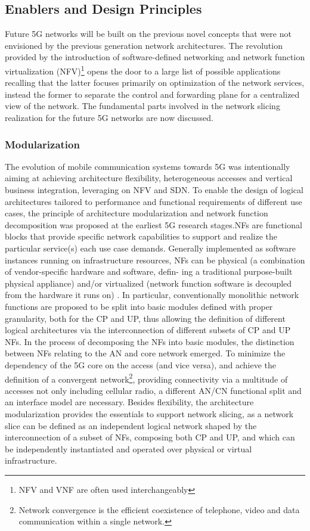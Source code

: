 \documentclass{article}
\begin{document}
\subsection{Enablers and Design Principles}
Future 5G networks will be built on the previous novel concepts that were not envisioned by the previous generation
network architectures. The revolution provided by the introduction of software-defined networking
and network function virtualization (NFV)\footnote{NFV and VNF are often used interchangeably} opens the door to a
large list of possible applications recalling that the latter focuses primarily on optimization of the network services, instead the former to separate the control and forwarding plane for a centralized view of the network. The fundamental parts involved in the network slicing realization for the future 5G networks are now discussed.

\subsubsection{Modularization}
The evolution of mobile communication systems towards 5G was intentionally aiming at achieving
architecture flexibility, heterogeneous accesses and vertical business integration, leveraging on NFV and SDN. To enable the design of logical architectures tailored to
performance and functional requirements of different use cases, the principle of architecture
modularization and network function decomposition was proposed at the earliest 5G research
stages.\gls{NF}s are functional blocks
that provide specific network capabilities to support and realize the particular service(s) each
use case demands. Generally implemented
as software instances running on infrastructure
resources, NFs can be physical (a combination
of vendor-specific hardware and software, defin-
ing a traditional purpose-built physical appliance)
and/or virtualized (network function software is
decoupled from the hardware it runs on) \cite{ordonez2017network}. In particular, conventionally monolithic network functions are proposed to be split into basic modules defined with proper granularity, both for the \gls{CP} and \gls{UP}, thus allowing the definition of different logical architectures via the interconnection of
different subsets of CP and UP NFs.
In the process of decomposing the NFs into basic modules, the distinction between NFs relating to
the \gls{AN} and core network emerged. To minimize the dependency of the 5G
core on the access (and vice versa), and achieve the definition of a convergent network\footnote{Network convergence is the efficient coexistence of telephone, video and data communication within a single network.}, providing
connectivity via a multitude of accesses not only including cellular radio, a different AN/CN functional split and an interface model are necessary.
Besides flexibility, the architecture modularization provides the essentials to support network
­slicing, as a network slice can be defined as an independent logical network shaped by the interconnection of a subset of NFs, composing both CP and UP, and which can be independently instantiated
and operated over physical or virtual infrastructure.
\end{document}
